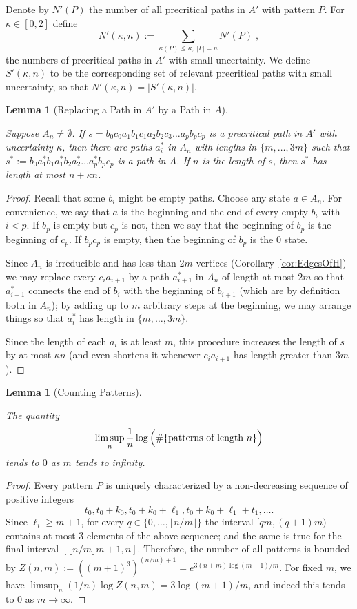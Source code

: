 \documentclass[12pt]{amsart}
\newcommand{\0}{\texttt{0}}
\newcommand{\1}{\texttt{1}}
\newtheorem{lemma}[theorem]{Lemma}
\theoremstyle{definition}
\numberwithin{equation}{section}
\newcommand{\lineclear}{\rule{0pt}{2pt}\newline}
\begin{document}
Denote by $N'(P)$ the number of all precritical paths in $A'$ with pattern $P$.
For $\kappa\in [0,2]$ define 
 \[
N'(\kappa,n):= \sum_{\kappa(P)\le \kappa,\  |P|=n} N'(P)
\;,
\]
the numbers of precritical paths in $A'$ with small uncertainty. 
We define $S'(\kappa,n)$ to be the corresponding set of relevant precritical paths with small uncertainty, so that $N'(\kappa,n)=|S'(\kappa,n)|$. 


\begin{lemma}[Replacing a Path in $A'$ by a Path in $A$]
\label{lem:substitution} \lineclear
Suppose $A_n\neq\emptyset$.
If $s=b_0c_0 a_1b_1c_1a_2b_2c_3\dots a_pb_pc_p$ is a precritical path in $A'$ with uncertainty $\kappa$, then there are paths $a^*_i$ in $A_n$ with lengths in $\{m,\dots,3m\}$ such that 
$s^*:=b_0 a^*_1 b_1a^*_1b_2a^*_2\dots a^*_p b_pc_p$ is a path in $A$. If $n$ is the length of 
$s$, then $s^*$ has length at most $n + \kappa n$.
\end{lemma}
\begin{proof}
Recall that some $b_i$ might be empty paths. Choose any state $a\in A_n$. For  convenience, we say that $a$ is the beginning and the end of every empty $b_i$ with $i<p$. If $b_p$ is empty but $c_p$ is not, then we say that the beginning of $b_p$ is the beginning of $c_p$. If  $b_pc_p$ is empty, then the beginning of $b_p$ is the $0$ state. 

 
Since $A_n$ is irreducible and has less than $2m$ vertices (Corollary~\ref{cor:EdgesOfH}) we may replace every $c_ia_{i+1}$ by a path $a^*_{i+1}$ in $A_n$ of length at most $2m$ so that $a^*_{i+1}$ connects the end of $b_{i}$ with the  beginning of $b_{i+1}$ (which are by definition both in $A_n$); by adding up to $m$ arbitrary steps at the beginning, we may arrange things so that $a^*_i$ has length in $\{m,\dots,3m\}$.

Since the length of each $a_i$ is at least $m$, this procedure increases the length of $s$ by at most $\kappa n$ (and even shortens it whenever $c_ia_{i+1}$ has length greater than $3m$). 
\end{proof}

\begin{lemma}[Counting Patterns]
\label{lem:PatternsGrowth} \lineclear
The quantity  
\[
 \limsup_{n}\frac{1}{n}\log\left(\# \{\text{patterns of length }n\}\rule{0pt}{11pt}\right)
\]
tends to $0$ as $m$ tends to infinity. 
\end{lemma}
\begin{proof}
Every pattern $P$ is uniquely characterized by a non-decreasing sequence of positive integers
\[t_0,t_0+k_0,t_0+k_0+\ell_1, t_0+k_0+\ell_1+t_1, \dots. \]
Since $\ell_i\ge m+1$, for every $q\in\{0,\dots,\lfloor n/m\rfloor\}$ the interval $[qm,(q+1)m)$ contains at most $3$ elements of the above sequence; and the same is true for the final interval $[\lfloor n/m\rfloor m+1, n]$. Therefore, the number of all patterns is bounded by $Z(n,m):=((m+1)^3)^{(n/m)+1}=e^{{3(n+m)\log(m+1)}/{m}}$. For fixed $m$, we have $\limsup_n (1/n)\log Z(n,m)=3\log(m+1)/m$, and indeed this tends to $0$ as $m\to\infty$.
\end{proof}
\end{document}
